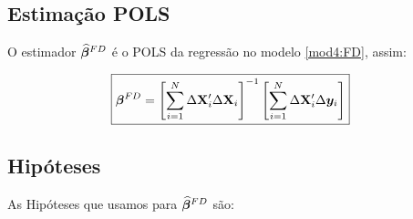 \documentclass[11pt, oneside, a4paper, article]{article}
\numberwithin{equation}{section}
\begin{document}
\subsection{Estimação POLS}

O estimador $\widehat{\boldsymbol{\beta}}^{FD}$ é o POLS da regressão no modelo \eqref{mod4:FD}, assim:

\vspace{-1 em}
\begin{align} \label{beta:pols:FD}
	\Aboxed{
		\betavec^{FD} =
		\left[ \sum_{i=1}^{N} \Delta \Xmat_{i}' \Delta \Xmat_{i} \right]^{-1}
		\left[ \sum_{i=1}^{N} \Delta \Xmat_{i}' \Delta \yvec_{i} \right]
	}
\end{align}

\subsection{Hipóteses}

As Hipóteses que usamos para $\widehat{\boldsymbol{\beta}}^{FD}$ são:
\end{document}
